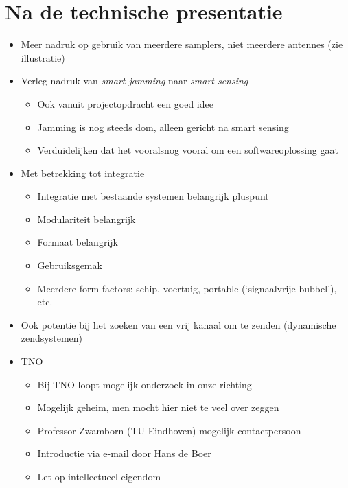 \documentclass[12pt, a4paper]{article}
\begin{document}
\section{Na de technische presentatie}
\begin{itemize}
    \item Meer nadruk op gebruik van meerdere samplers, niet meerdere antennes (zie illustratie)

    \item Verleg nadruk van \emph{smart jamming} naar \emph{smart sensing}
    \begin{itemize}
        \item Ook vanuit projectopdracht een goed idee
        \item Jamming is nog steeds dom, alleen gericht na smart sensing
        \item Verduidelijken dat het vooralsnog vooral om een softwareoplossing gaat
    \end{itemize}

    \item Met betrekking tot integratie
    \begin{itemize}
        \item Integratie met bestaande systemen belangrijk pluspunt
        \item Modulariteit belangrijk
        \item Formaat belangrijk
        \item Gebruiksgemak
        \item Meerdere form-factors: schip, voertuig, portable (`signaalvrije bubbel'), etc.
    \end{itemize}

    \item Ook potentie bij het zoeken van een vrij kanaal om te zenden (dynamische zendsystemen)

    \item TNO
    \begin{itemize}
        \item Bij TNO loopt mogelijk onderzoek in onze richting
        \item Mogelijk geheim, men mocht hier niet te veel over zeggen
        \item Professor Zwamborn (TU Eindhoven) mogelijk contactpersoon
        \item Introductie via e-mail door Hans de Boer
        \item Let op intellectueel eigendom
    \end{itemize}


\end{itemize}
\end{document}
